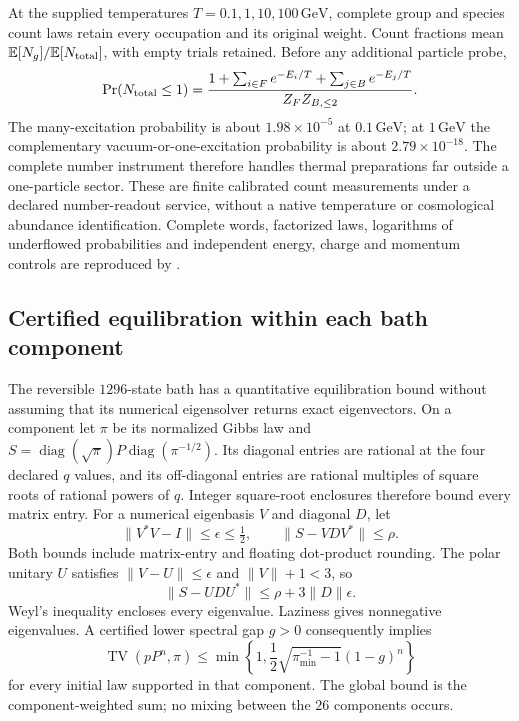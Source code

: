 At the supplied temperatures $T=0.1,1,10,100\,\mathrm{GeV}$, complete
group and species count laws retain every occupation and its original
weight. Count fractions mean $\mathbb E[N_g]/\mathbb E[N_{\rm total}]$,
with empty trials retained. Before any additional particle probe,
\[
 \Pr(N_{\rm total}\leq1)=
 \frac{1+\sum_{i\in F}e^{-E_i/T}+\sum_{j\in B}e^{-E_j/T}}
      {Z_F Z_{B,\leq2}}.
\]
The many-excitation probability is about $1.98\times10^{-5}$ at
$0.1\,\mathrm{GeV}$; at $1\,\mathrm{GeV}$ the complementary
vacuum-or-one-excitation probability is about $2.79\times10^{-18}$.
The complete number instrument therefore handles thermal preparations
far outside a one-particle sector. These are finite calibrated count
measurements under a declared number-readout service, without a native
temperature or cosmological abundance identification. Complete words,
factorized laws, logarithms of underflowed probabilities and independent
energy, charge and momentum controls are reproduced by
 \cite{ophrepo}.

\subsection{Certified equilibration within each bath component}

The reversible $1296$-state bath has a quantitative equilibration bound
without assuming that its numerical eigensolver returns exact eigenvectors.
On a component let $\pi$ be its normalized Gibbs law and
$S=\operatorname{diag}(\sqrt\pi)P\operatorname{diag}(\pi^{-1/2})$.
Its diagonal entries are rational at the four declared $q$ values, and
its off-diagonal entries are rational multiples of square roots of
rational powers of $q$. Integer square-root enclosures therefore bound
every matrix entry. For a numerical eigenbasis $V$ and diagonal $D$, let
\[
 \|V^*V-I\|\leq\epsilon\leq\tfrac12,
 \qquad \|S-VDV^*\|\leq\rho.
\]
Both bounds include matrix-entry and floating dot-product rounding.
The polar unitary $U$ satisfies $\|V-U\|\leq\epsilon$ and
$\|V\|+1<3$, so
\[
 \|S-UDU^*\|\leq\rho+3\|D\|\epsilon.
\]
Weyl's inequality encloses every eigenvalue. Laziness gives nonnegative
eigenvalues. A certified lower spectral gap $g>0$ consequently implies
\[
 \operatorname{TV}(pP^n,\pi)
 \leq\min\left\{1,\frac12\sqrt{\pi_{\min}^{-1}-1}(1-g)^n\right\}
\]
for every initial law supported in that component. The global bound is
the component-weighted sum; no mixing between the $26$ components occurs.

